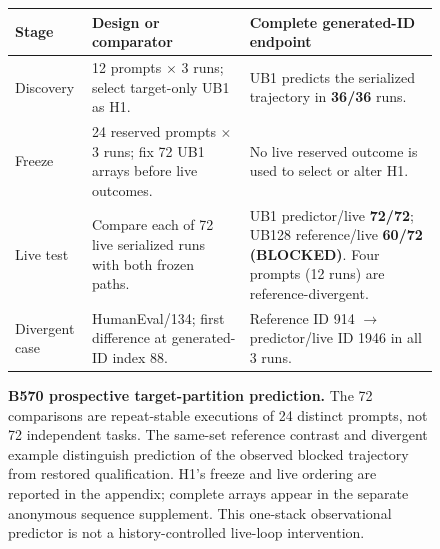 \begin{figure}[t]
\centering
\small
\begin{tabular}{@{}p{0.95in}p{2.12in}p{3.08in}@{}}
\toprule
Stage & Design or comparator & Complete generated-ID endpoint \\
\midrule
Discovery & 12 prompts $\times$ 3 runs; select target-only UB1 as H1. & UB1 predicts the serialized trajectory in \textbf{36/36} runs. \\
Freeze & 24 reserved prompts $\times$ 3 runs; fix 72 UB1 arrays before live outcomes. & No live reserved outcome is used to select or alter H1. \\
Live test & Compare each of 72 live serialized runs with both frozen paths. & UB1 predictor/live \textbf{72/72}; UB128 reference/live \textbf{60/72 (BLOCKED)}. Four prompts (12 runs) are reference-divergent. \\
Divergent case & HumanEval/134; first difference at generated-ID index 88. & Reference ID 914 $\rightarrow$ predictor/live ID 1946 in all 3 runs. \\
\bottomrule
\end{tabular}
\caption{\textbf{B570 prospective target-partition prediction.} The 72 comparisons are repeat-stable executions of 24 distinct prompts, not 72 independent tasks. The same-set reference contrast and divergent example distinguish prediction of the observed blocked trajectory from restored qualification. H1's freeze and live ordering are reported in the appendix; complete arrays appear in the separate anonymous sequence supplement. This one-stack observational predictor is not a history-controlled live-loop intervention.}
\label{fig:translation}
\end{figure}
